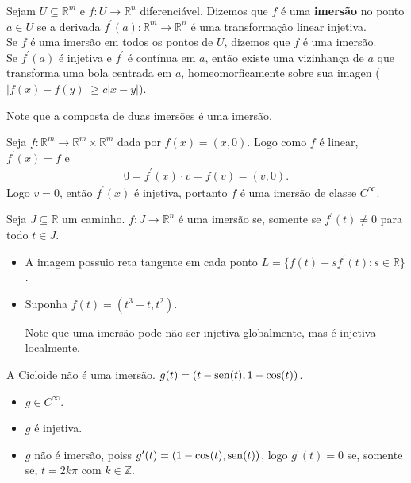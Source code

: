 \begin{definition}[Imersão]
  Sejam $U\subseteq\mathbb{R}^{m}$ e $f:U\to\mathbb{R}^{n}$ diferenciável. Dizemos que $f$ é uma \textbf{imersão} no ponto $a\in U$ se a derivada $f^{\prime}(a):\mathbb{R}^{m}\to\mathbb{R}^{n}$ é uma transformação linear injetiva.\\
  Se $f$ é uma imersão em todos os pontos de $U$, dizemos que $f$ é uma imersão.\\
  Se $f^{\prime}(a)$ é injetiva e $f^{\prime}$ é contínua em $a$, então existe uma vizinhança de $a$ que transforma uma bola centrada em $a$, homeomorficamente sobre sua imagen ($|f(x)-f(y)|\geq c|x-y|$). 
\end{definition}
\begin{note}
  Note que a composta de duas imersões é uma imersão.
\end{note}
\begin{example}
  Seja $f:\mathbb{R}^{m}\to\mathbb{R}^{m} \times\mathbb{R}^{m}$ dada por $f(x)=(x,0)$. Logo como $f$  é linear, $f^{\prime}(x)=f$ e
  \begin{align*}
    0=f^{\prime}(x)\cdot v=f(v)=(v,0).
  \end{align*}
  Logo $v=0$, então $f^{\prime}(x)$ é injetiva, portanto $f$ é uma imersão de classe $C^{\infty}$. 
\end{example}
\begin{example}
  Seja $J\subseteq\mathbb{R}$ um caminho. $f:J\to\mathbb{R}^{n}$ é uma imersão se, somente se $f^{\prime}(t)\neq 0$ para todo $t\in J$.
\end{example}
\begin{note}
  \begin{itemize}
    \item A imagem possuio reta tangente em cada ponto $L=\{f(t)+sf^{\prime}(t):s\in\mathbb{R}\}$.
    \item Suponha $f(t)=(t^{3}-t,t^{2})$.
      \begin{center}
          
      \end{center}
      Note que uma imersão pode não ser injetiva globalmente, mas é injetiva localmente.
  \end{itemize}
\end{note}
\begin{example}
  A Cicloide não é uma imersão. $g(t)=(t-\operatorname{sen}(t),1-\cos(t))$.
  \begin{center}
      
  \end{center}
  \begin{itemize}
    \item $g\in C^{\infty}$.
    \item $g$ é injetiva.
    \item $g$ não é imersão, poiss $g^{\prime}(t)=(1-\cos(t),\operatorname{sen}(t))$, logo $g^{\prime}(t)=0$ se, somente se, $t=2k\pi$ com $k\in\mathbb{Z}$. 
  \end{itemize}
\end{example}
